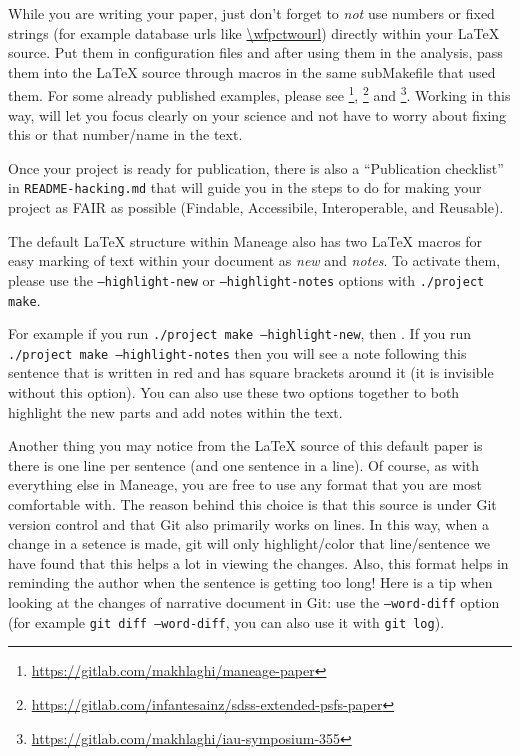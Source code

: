 \documentclass[10pt, twocolumn]{article}
\begin{document}
While you are writing your paper, just don't forget to \emph{not} use numbers or fixed strings (for example database urls like \url{\wfpctwourl}) directly within your \LaTeX{} source.
Put them in configuration files and after using them in the analysis, pass them into the \LaTeX{} source through macros in the same subMakefile that used them.
For some already published examples, please see \citet{maneage}\footnote{\url{https://gitlab.com/makhlaghi/maneage-paper}}, \citet{infantesainz20}\footnote{\url{https://gitlab.com/infantesainz/sdss-extended-psfs-paper}} and \citet{akhlaghi19}\footnote{\url{https://gitlab.com/makhlaghi/iau-symposium-355}}.
Working in this way, will let you focus clearly on your science and not have to worry about fixing this or that number/name in the text.

Once your project is ready for publication, there is also a ``Publication checklist'' in \texttt{README-hacking.md} that will guide you in the steps to do for making your project as FAIR as possible (Findable, Accessibile, Interoperable, and Reusable).

The default \LaTeX{} structure within Maneage also has two \LaTeX{} macros for easy marking of text within your document as \emph{new} and \emph{notes}.
To activate them, please use the \texttt{--highlight-new} or \texttt{--highlight-notes} options with \texttt{./project make}.

For example if you run \texttt{./project make --highlight-new}, then .
If you run \texttt{./project make --highlight-notes} then you will see a note following this sentence that is written in red and has square brackets around it (it is invisible without this option).
You can also use these two options together to both highlight the new parts and add notes within the text.

Another thing you may notice from the \LaTeX{} source of this default paper is there is one line per sentence (and one sentence in a line).
Of course, as with everything else in Maneage, you are free to use any format that you are most comfortable with.
The reason behind this choice is that this source is under Git version control and that Git also primarily works on lines.
In this way, when a change in a setence is made, git will only highlight/color that line/sentence we have found that this helps a lot in viewing the changes.
Also, this format helps in reminding the author when the sentence is getting too long!
Here is a tip when looking at the changes of narrative document in Git: use the \texttt{--word-diff} option (for example \texttt{git diff --word-diff}, you can also use it with \texttt{git log}).
\end{document}
